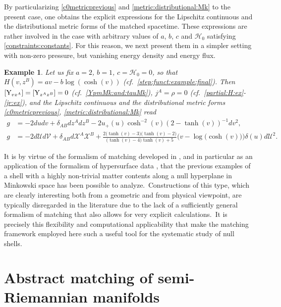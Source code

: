 \documentclass[11pt]{article}
\numberwithin{equation}{section}
\newtheorem{example}[theorem]{Example}
\newcommand{\cx}{\mathcal{X}}
\def\Y{\textup{Y}}
\def\Y{\textup{Y}}
\newcommand{\lp}{\left(}
\newcommand{\rp}{\right)}
\newcommand{\cu}{\mathcal{U}}
\newcommand{\cv}{\mathcal{V}}
\begin{document}
By particularizing \eqref{c0metricprevious} and \eqref{metric:distributional:Mk} to the present case, one obtains the explicit expressions for the Lipschitz continuous and the distributional metric forms of the matched spacetime. These expressions are rather involved in the case with arbitrary values of $a$, $b$, $c$ and $\mathcal{H}_0$ satisfying \eqref{constraints:constants}. For this reason, we next present them in a simpler setting with non-zero pressure, but vanishing energy density and energy flux.\ 
\begin{example}
Let us fix $a=2$, $b=1$, $c=\mathcal{H}_0=0$, so that $H(v,z^B)=a v-b\log\lp\cosh\lp v\rp\rp $ (cf.\ \eqref{step:funct:example:final}). Then $[\Y_{vz^A}]=[\Y_{z^Az^B}]=0$ (cf.\ \eqref{YpmMk:and:tauMk}), $j^A=\rho=0$ (cf.\ \eqref{partial:H:ex}-\eqref{jr:ex}), and the Lipschitz continuous and the distributional metric forms \eqref{c0metricprevious}, \eqref{metric:distributional:Mk} read
\begin{align*}
g&=-2dudv +\delta_{AB}dz^Adz^B-2u_+( u) \cosh^{-2}(v)\lp 2-\tanh (v)\rp^{-1}dv^2,\\
g&=-2d\cu d\cv+\delta_{AB}d\cx^A \cx^B+\frac{2\big(\tanh (v)-3\big) \big(\tanh (v)-2\big) }{\big(\tanh (v)-4\big) \tanh (v)+5}\Big(v-\log \big(\cosh (v)\big)\Big)\delta(u) d\cu^2.
\end{align*}
\end{example}
It is by virtue of the formalism of matching developed in \cite{manzano2021null,manzano2022general,manzano2023matching}, and in particular as an application of the formalism of hypersurface data \cite{mars2013constraint,mars2020hypersurface}, that the previous examples of a shell with a highly non-trivial matter contents along a null hyperplane in  Minkowski space has been possible to analyze.\ Constructions of this type, which are clearly interesting both from a geometric and from physical viewpoint, are typically disregarded in the literature due to the lack of a sufficiently general formalism of matching that also allows for very explicit calculations.\ It is precisely this flexibility and computational applicability that make the matching framework employed here such a useful tool for the systematic study of null shells.



\appendix

\section{Abstract matching of semi-Riemannian manifolds}\label{app:B}
\end{document}
